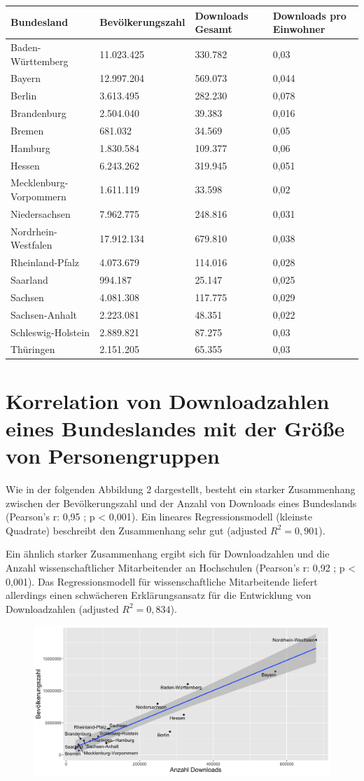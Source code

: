 \documentclass[a4paper,
fontsize=11pt,
oneside,
numbers=noperiodatend,
parskip=half-,
bibliography=totoc,
final
]{scrartcl}
\begin{document}
\begin{longtable}[]{@{}llll@{}}
\toprule
\textbf{Bundesland} & \textbf{Bevölkerungszahl} & \textbf{Downloads
Gesamt} & \textbf{Downloads pro Einwohner}\tabularnewline
\midrule
\endhead
Baden-Württemberg & 11.023.425 & 330.782 & 0,03\tabularnewline
Bayern & 12.997.204 & 569.073 & 0,044\tabularnewline
Berlin & 3.613.495 & 282.230 & 0,078\tabularnewline
Brandenburg & 2.504.040 & 39.383 & 0,016\tabularnewline
Bremen & 681.032 & 34.569 & 0,05\tabularnewline
Hamburg & 1.830.584 & 109.377 & 0,06\tabularnewline
Hessen & 6.243.262 & 319.945 & 0,051\tabularnewline
Mecklenburg-Vorpommern & 1.611.119 & 33.598 & 0,02\tabularnewline
Niedersachsen & 7.962.775 & 248.816 & 0,031\tabularnewline
Nordrhein-Westfalen & 17.912.134 & 679.810 & 0,038\tabularnewline
Rheinland-Pfalz & 4.073.679 & 114.016 & 0,028\tabularnewline
Saarland & 994.187 & 25.147 & 0,025\tabularnewline
Sachsen & 4.081.308 & 117.775 & 0,029\tabularnewline
Sachsen-Anhalt & 2.223.081 & 48.351 & 0,022\tabularnewline
Schleswig-Holstein & 2.889.821 & 87.275 & 0,03\tabularnewline
Thüringen & 2.151.205 & 65.355 & 0,03\tabularnewline
\bottomrule
\end{longtable}

\hypertarget{korrelation-von-downloadzahlen-eines-bundeslandes-mit-der-gruxf6uxdfe-von-personengruppen}{%
\section{Korrelation von Downloadzahlen eines Bundeslandes mit der
Größe von
Personengruppen}\label{korrelation-von-downloadzahlen-eines-bundeslandes-mit-der-gruxf6uxdfe-von-personengruppen}}

Wie in der folgenden Abbildung 2 dargestellt, besteht ein starker
Zusammenhang zwischen der Bevölkerungszahl und der Anzahl von Downloads
eines Bundeslands (Pearson's r: 0,95 ; p \textless{} 0,001). Ein
lineares Regressionsmodell (kleinste Quadrate) beschreibt den
Zusammenhang sehr gut (\(\text{adjusted\ }R^{2} = 0,901\)).

Ein ähnlich starker Zusammenhang ergibt sich für Downloadzahlen und die
Anzahl wissenschaftlicher Mitarbeitender an Hochschulen (Pearson's r:
0,92 ; p \textless{} 0,001). Das Regressionsmodell für wissenschaftliche
Mitarbeitende liefert allerdings einen schwächeren Erklärungsansatz für
die Entwicklung von Downloadzahlen (\(\text{adjusted\ }R^{2} = 0,834\)).

\begin{figure}
\centering
\includegraphics{images/Downloadzahl_Bevoelkerung.png}
\end{figure}
\end{document}
